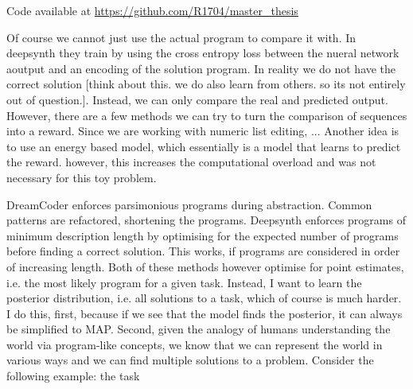 Code available at \url{https://github.com/R1704/master_thesis}











Of course we cannot just use the actual program to compare it with. In deepsynth they train by using the cross entropy loss between the nueral network aoutput and an encoding of the solution program. In reality we do not have the correct solution [think about this. we do also learn from others. so its not entirely out of question.]. Instead, we can only compare the real and predicted output. However, there are a few methods we can try to turn the comparison of sequences into a reward. Since we are working with numeric list editing, ...
Another idea is to use an energy based model, which essentially is a model that learns to predict the reward. however, this increases the computational overload and was not necessary for this toy problem.























DreamCoder enforces parsimonious programs during abstraction. Common patterns are refactored, shortening the programs. Deepsynth enforces programs of minimum description length by optimising for the expected number of programs before finding a correct solution. This works, if programs are considered in order of increasing length. Both of these methods however optimise for point estimates, i.e. the most likely program for a given task. Instead, I want to learn the posterior distribution, i.e. all solutions to a task, which of course is much harder.
I do this, first, because if we see that the model finds the posterior, it can always be simplified to MAP. Second, given the analogy of humans understanding the world via program-like concepts, we know that we can represent the world in various ways and we can find multiple solutions to a problem. Consider the following example: the task 

